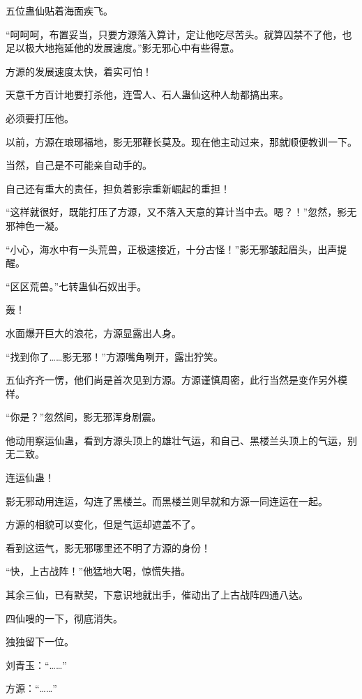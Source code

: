 
\begin{this_body}

五位蛊仙贴着海面疾飞。

“呵呵呵，布置妥当，只要方源落入算计，定让他吃尽苦头。就算囚禁不了他，也足以极大地拖延他的发展速度。”影无邪心中有些得意。

方源的发展速度太快，着实可怕！

天意千方百计地要打杀他，连雪人、石人蛊仙这种人劫都搞出来。

必须要打压他。

以前，方源在琅琊福地，影无邪鞭长莫及。现在他主动过来，那就顺便教训一下。

当然，自己是不可能亲自动手的。

自己还有重大的责任，担负着影宗重新崛起的重担！

“这样就很好，既能打压了方源，又不落入天意的算计当中去。嗯？！”忽然，影无邪神色一凝。

“小心，海水中有一头荒兽，正极速接近，十分古怪！”影无邪皱起眉头，出声提醒。

“区区荒兽。”七转蛊仙石奴出手。

轰！

水面爆开巨大的浪花，方源显露出人身。

“找到你了……影无邪！”方源嘴角咧开，露出狞笑。

五仙齐齐一愣，他们尚是首次见到方源。方源谨慎周密，此行当然是变作另外模样。

“你是？”忽然间，影无邪浑身剧震。

他动用察运仙蛊，看到方源头顶上的雄壮气运，和自己、黑楼兰头顶上的气运，别无二致。

连运仙蛊！

影无邪动用连运，勾连了黑楼兰。而黑楼兰则早就和方源一同连运在一起。

方源的相貌可以变化，但是气运却遮盖不了。

看到这运气，影无邪哪里还不明了方源的身份！

“快，上古战阵！”他猛地大喝，惊慌失措。

其余三仙，已有默契，下意识地就出手，催动出了上古战阵四通八达。

四仙嗖的一下，彻底消失。

独独留下一位。

刘青玉：“……”

方源：“……”


\end{this_body}
